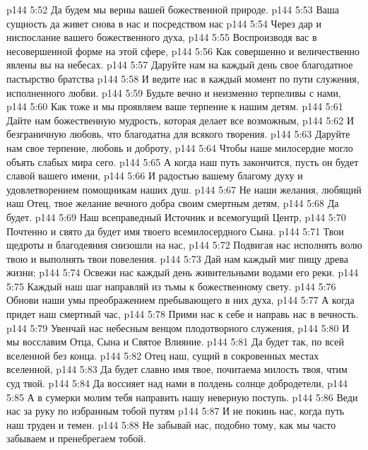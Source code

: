 \vs p144 5:52 \hsetoff Да будем мы верны вашей божественной природе.
\vs p144 5:53 Ваша сущность да живет снова в нас и посредством нас
\vs p144 5:54 \hsetoff Через дар и ниспослание вашего божественного духа,
\vs p144 5:55 Воспроизводя вас в несовершенной форме на этой сфере,
\vs p144 5:56 \hsetoff Как совершенно и величественно явлены вы на небесах.
\vs p144 5:57 Даруйте нам на каждый день свое благодатное пастырство братства
\vs p144 5:58 \hsetoff И ведите нас в каждый момент по пути служения, исполненного любви.
\vs p144 5:59 Будьте вечно и неизменно терпеливы с нами,
\vs p144 5:60 \hsetoff Как тоже и мы проявляем ваше терпение к нашим детям.
\vs p144 5:61 Дайте нам божественную мудрость, которая делает все возможным,
\vs p144 5:62 \hsetoff И безграничную любовь, что благодатна для всякого творения.
\vs p144 5:63 Даруйте нам свое терпение, любовь и доброту,
\vs p144 5:64 \hsetoff Чтобы наше милосердие могло объять слабых мира сего.
\vs p144 5:65 А когда наш путь закончится, пусть он будет славой вашего имени,
\vs p144 5:66 \hsetoff И радостью вашему благому духу и удовлетворением помощникам наших душ.
\vs p144 5:67 Не наши желания, любящий наш Отец, твое желание вечного добра своим смертным детям,
\vs p144 5:68 \hsetoff Да будет.
\separatorline
\vs p144 5:69 Наш всеправедный Источник и всемогущий Центр,
\vs p144 5:70 \hsetoff Почтенно и свято да будет имя твоего всемилосердного Сына.
\vs p144 5:71 Твои щедроты и благодеяния снизошли на нас,
\vs p144 5:72 \hsetoff Подвигая нас исполнять волю твою и выполнять твои повеления.
\vs p144 5:73 Дай нам каждый миг пищу древа жизни;
\vs p144 5:74 \hsetoff Освежи нас каждый день живительными водами его реки.
\vs p144 5:75 Каждый наш шаг направляй из тьмы к божественному свету.
\vs p144 5:76 \hsetoff Обнови наши умы преображением пребывающего в них духа,
\vs p144 5:77 А когда придет наш смертный час,
\vs p144 5:78 \hsetoff Прими нас к себе и направь нас в вечность.
\vs p144 5:79 Увенчай нас небесным венцом плодотворного служения,
\vs p144 5:80 \hsetoff И мы восславим Отца, Сына и Святое Влияние.
\vs p144 5:81 Да будет так, по всей вселенной без конца.
\separatorline
\vs p144 5:82 Отец наш, сущий в сокровенных местах вселенной,
\vs p144 5:83 \hsetoff Да будет славно имя твое, почитаема милость твоя, чтим суд твой.
\vs p144 5:84 Да воссияет над нами в полдень солнце добродетели,
\vs p144 5:85 \hsetoff А в сумерки молим тебя направить нашу неверную поступь.
\vs p144 5:86 Веди нас за руку по избранным тобой путям
\vs p144 5:87 \hsetoff И не покинь нас, когда путь наш труден и темен.
\vs p144 5:88 Не забывай нас, подобно тому, как мы часто забываем и пренебрегаем тобой.
